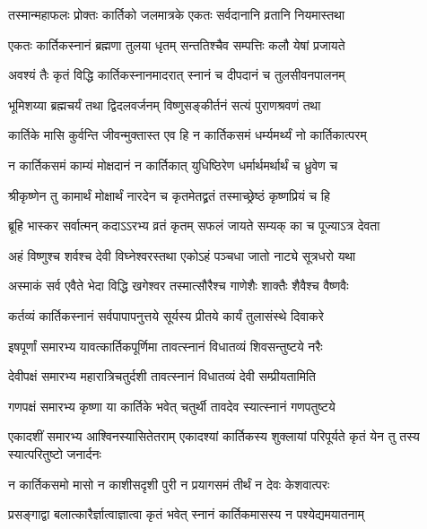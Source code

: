 \twolineshloka
{तस्मान्महाफलः प्रोक्तः कार्तिको जलमात्रके}
{एकतः सर्वदानानि व्रतानि नियमास्तथा} %

\twolineshloka
{एकतः कार्तिकस्नानं ब्रह्मणा तुलया धृतम्}
{सन्ततिश्चैव सम्पत्तिः कलौ येषां प्रजायते} %

\twolineshloka
{अवश्यं तैः कृतं विद्धि कार्तिकस्नानमादरात्}
{स्नानं च दीपदानं च तुलसीवनपालनम्} %

\twolineshloka
{भूमिशय्या ब्रह्मचर्यं तथा द्विदलवर्जनम्}
{विष्णुसङ्कीर्तनं सत्यं पुराणश्रवणं तथा} %

\twolineshloka
{कार्तिके मासि कुर्वन्ति जीवन्मुक्तास्त एव हि}
{न कार्तिकसमं धर्म्यमर्थ्यं नो कार्तिकात्परम्} %

\twolineshloka
{न कार्तिकसमं काम्यं मोक्षदानं न कार्तिकात्}
{युधिष्ठिरेण धर्मार्थमर्थार्थं च ध्रुवेण च} %

\twolineshloka
{श्रीकृष्णेन तु कामार्थं मोक्षार्थं नारदेन च}
{कृतमेतद्व्रतं तस्माच्छ्रेष्ठं कृष्णप्रियं च हि} %


\twolineshloka
{ब्रूहि भास्कर सर्वात्मन् कदाऽऽरभ्य व्रतं कृतम्}
{सफलं जायते सम्यक् का च पूज्याऽत्र देवता} %


\twolineshloka
{अहं विष्णुश्च शर्वश्च देवी विघ्नेश्वरस्तथा}
{एकोऽहं पञ्चधा जातो नाट्ये सूत्रधरो यथा} %

\twolineshloka
{अस्माकं सर्व एवैते भेदा विद्धि खगेश्वर}
{तस्मात्सौरैश्च गाणेशैः शाक्तैः शैवैश्च वैष्णवैः} %

\twolineshloka
{कर्तव्यं कार्तिकस्नानं सर्वपापापनुत्तये}
{सूर्यस्य प्रीतये कार्यं तुलासंस्थे दिवाकरे} %

\twolineshloka
{इषपूर्णां समारभ्य यावत्कार्तिकपूर्णिमा}
{तावत्स्नानं विधातव्यं शिवसन्तुष्टये नरैः} %

\twolineshloka
{देवीपक्षं समारभ्य महारात्रिचतुर्दशी}
{तावत्स्नानं विधातव्यं देवी सम्प्रीयतामिति} %

\twolineshloka
{गणपक्षं समारभ्य कृष्णा या कार्तिके भवेत्}
{चतुर्थी तावदेव स्यात्स्नानं गणपतुष्टये} %

\threelineshloka
{एकादशीं समारभ्य आश्विनस्यासितेतराम्}
{एकादश्यां कार्तिकस्य शुक्लायां परिपूर्यते}
{कृतं येन तु तस्य स्यात्परितुष्टो जनार्दनः} %

\twolineshloka
{न कार्तिकसमो मासो न काशीसदृशी पुरी}
{न प्रयागसमं तीर्थं न देवः केशवात्परः} %

\twolineshloka
{प्रसङ्गाद्वा बलात्कारैर्ज्ञात्वाज्ञात्वा कृतं भवेत्}
{स्नानं कार्तिकमासस्य न पश्येद्यमयातनाम्} %

